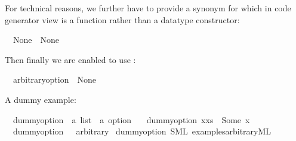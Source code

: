 \begin{isabellebody}
\begin{isamarkuptext}
  For technical reasons, we further have to provide a
  synonym for  which in code generator view
  is a function rather than a datatype constructor:%
\end{isamarkuptext}%
\isamarkuptrue%
\isamarkupfalse%
\isanewline
\ \ {\isachardoublequoteopen}None{\isacharprime}\ {\isacharequal}\ None{\isachardoublequoteclose}%
\begin{isamarkuptext}%
Then finally we are enabled to use \isa{{\isasymCODEAXIOMS}}:%
\end{isamarkuptext}%
\isamarkuptrue%
\isamarkupfalse%
\isanewline
\ \ arbitrary{\isacharunderscore}option\ {\isasymequiv}\ None{\isacharprime}%
\begin{isamarkuptext}%
A dummy example:%
\end{isamarkuptext}%
\isamarkuptrue%
\isamarkupfalse%
\isanewline
\ \ dummy{\isacharunderscore}option\ {\isacharcolon}{\isacharcolon}\ {\isachardoublequoteopen}{\isacharprime}a\ list\ {\isasymRightarrow}\ {\isacharprime}a\ option{\isachardoublequoteclose}\ \isanewline
\ \ {\isachardoublequoteopen}dummy{\isacharunderscore}option\ {\isacharparenleft}x{\isacharhash}xs{\isacharparenright}\ {\isacharequal}\ Some\ x{\isachardoublequoteclose}\isanewline
\ \ {\isachardoublequoteopen}dummy{\isacharunderscore}option\ {\isacharbrackleft}{\isacharbrackright}\ {\isacharequal}\ arbitrary{\isachardoublequoteclose}\isanewline
{}\isamarkupfalse%
\ dummy{\isacharunderscore}option\ {\isacharparenleft}SML\ {\isachardoublequoteopen}examples{\isacharslash}arbitrary{\isachardot}ML{\isachardoublequoteclose}{\isacharparenright}%
\begin{isamarkuptext}%


\end{isamarkuptext}
\end{isabellebody}
